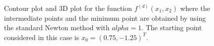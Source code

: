 \documentclass[a4paper,11pt]{article}
\begin{document}
	\begin{figure}[H]
		\centering
		 \quad
		\caption{Contour plot and 3D plot for the function $f^{(d)}(x_{1},x_{2})$ where the intermediate points and the minimum point are obtained by using the standard Newton method with $alpha=1$. The starting point considered in this case is $x_{0}=(0.75,-1.25)^{T}$.}
		\label{Fig:func_d}
	\end{figure}
\end{document}
